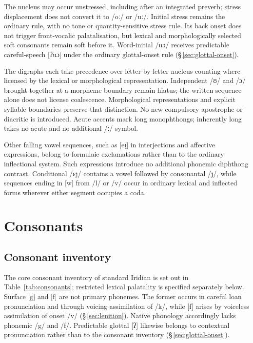 The nucleus may occur unstressed, including after an integrated preverb;
stress displacement does not convert it to /oː/ or /uː/. Initial stress
remains the ordinary rule, with no tone or quantity-sensitive stress rule.
Its back onset does not trigger front-vocalic palatalisation, but lexical
and morphologically selected soft consonants remain soft before it.
Word-initial /uɔ/ receives predictable careful-speech [ʔuɔ] under the
ordinary glottal-onset rule (§\,\ref{sec:glottal-onset}).

The digraphs  each take precedence over letter-by-letter
nucleus counting where licensed by the lexical or morphological
representation. Independent /ʊ/ and /ɔ/ brought together at a morpheme
boundary remain hiatus; the written sequence alone does not license
coalescence. Morphological representations and explicit syllable boundaries
preserve that distinction. No new compulsory apostrophe or diacritic is
introduced. Acute accents mark long monophthongs; inherently long
 takes no acute and no additional /ː/ symbol.

Other falling vowel sequences, such as [eɪ̯] in interjections and affective
expressions, belong to formulaic exclamations rather than to the ordinary
inflectional system. Such expressions introduce no additional phonemic
diphthong contrast. Conditional  /ɛj/ contains a vowel followed
by consonantal /j/, while sequences ending in [w] from /l/ or /v/ occur in
ordinary lexical and inflected forms wherever either segment occupies a coda.

\section{Consonants}

\subsection{Consonant inventory}\label{sec:consonant-inventory}

The core consonant inventory of standard Iridian is set out in
Table~\ref{tab:consonants}; restricted lexical palatality is specified
separately below. Surface [g] and [f] are not primary phonemes. The former occurs in careful
loan pronunciation and through voicing assimilation of /k/, while [f] arises
by voiceless assimilation of onset /v/
(§\,\ref{sec:lenition}). Native phonology accordingly lacks phonemic /g/ and
/f/. Predictable glottal [ʔ] likewise belongs to contextual pronunciation
rather than to the consonant inventory (§\,\ref{sec:glottal-onset}).

